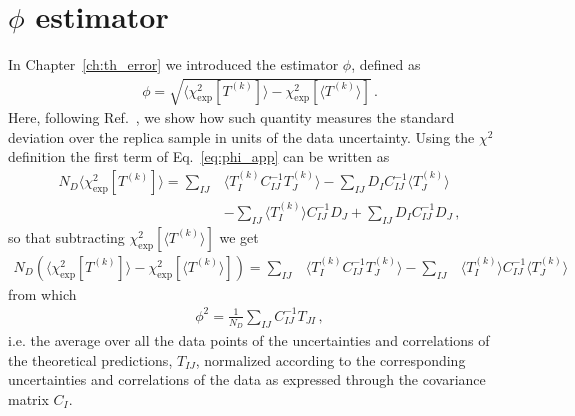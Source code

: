 \section{$\phi$ estimator}
\label{app:phi}
In Chapter~\ref{ch:th_error} we introduced the estimator $\phi$, defined as 
\begin{align}
    \label{eq:phi_app}
    \phi = \sqrt{\langle \chi^2_{\text{exp}}\left[T^{(k)}\right] \rangle - \chi^2_{\text{exp}}\left[\langle T^{(k)} \rangle\right]}\,.
\end{align}
Here, following Ref.~\cite{Ball:2014uwa}, we show how such quantity measures the standard
deviation over the replica sample in units of the data uncertainty.
%
Using the $\chi^2$ definition the first term of Eq.~\ref{eq:phi_app} can be written as
\begin{align}
    N_D \langle \chi^2_{\text{exp}}\left[T^{(k)}\right] \rangle = 
     \sum_{IJ}& \langle T^{(k)}_I  C_{IJ}^{-1} T^{(k)}_J \rangle  -  \sum_{IJ} D_I C_{IJ}^{-1} \langle T^{(k)}_J  \rangle
     \nonumber \\ &-  \sum_{IJ} \langle T^{(k)}_I \rangle C_{IJ}^{-1} D_J  
     + \sum_{IJ} D_I C_{IJ}^{-1} D_J\,,
\end{align}
so that subtracting $\chi^2_{\text{exp}}\left[\langle T^{(k)} \rangle\right]$ we get
\begin{align}
    N_D \left(\langle \chi^2_{\text{exp}}\left[T^{(k)}\right] \rangle 
    - \chi^2_{\text{exp}}\left[ \langle T^{(k)} \rangle \right]\right) =
    \sum_{IJ}& \langle T^{(k)}_I  C_{IJ}^{-1} T^{(k)}_J \rangle 
    - \sum_{IJ}& \langle T^{(k)}_I\rangle  C_{IJ}^{-1} \langle T^{(k)}_J \rangle
\end{align}
from which 
\begin{align}
    \phi^2 = \frac{1}{N_D}\sum_{IJ} C^{-1}_{IJ}T_{JI}\,,
\end{align}
i.e. the average over all the data points of the uncertainties and correlations of the theoretical
predictions, $T_{IJ}$, normalized according to the corresponding uncertainties and correlations of the
data as expressed through the covariance matrix $C_{I}$.